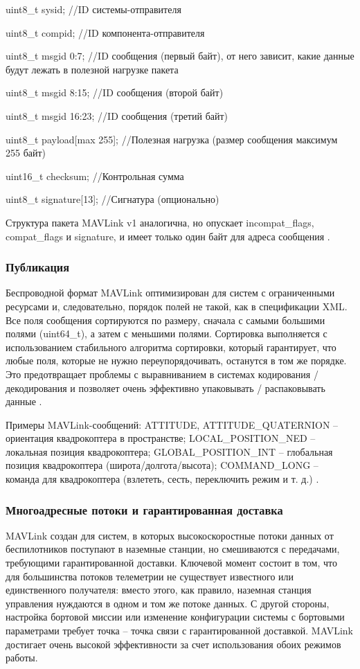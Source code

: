 uint8\_t sysid;              //ID системы-отправителя

uint8\_t compid;             //ID компонента-отправителя

uint8\_t msgid 0:7;          //ID сообщения (первый байт), от него зависит, какие данные будут лежать в полезной нагрузке пакета

uint8\_t msgid 8:15;         //ID сообщения (второй байт)

uint8\_t msgid 16:23;        //ID сообщения (третий байт)

uint8\_t payload[max 255];   //Полезная нагрузка (размер сообщения максимум 255 байт) 

uint16\_t checksum;          //Контрольная сумма

uint8\_t signature[13];      //Сигнатура (опционально)

Структура пакета MAVLink v1 аналогична, но опускает incompat\_flags, compat\_flags и signature, и имеет только один байт для адреса сообщения \cite{mavlink}.

\subsubsection{Публикация}
Беспроводной формат MAVLink оптимизирован для систем с ограниченными ресурсами и, следовательно, порядок полей не такой, как в спецификации XML. Все поля сообщения сортируются по размеру, сначала с самыми большими полями (uint64\_t), а затем с меньшими полями. Сортировка выполняется с использованием стабильного алгоритма сортировки, который гарантирует, что любые поля, которые не нужно переупорядочивать, останутся в том же порядке. Это предотвращает проблемы с выравниванием в системах кодирования / декодирования и позволяет очень эффективно упаковывать / распаковывать данные \cite{mavlink}.

Примеры MAV\-Link-сообщений:
ATTITUDE, ATTITUDE\_QUATERNION – ориентация квадрокоптера в пространстве;
LOCAL\_POSITION\_NED – локальная позиция квадрокоптера;
GLOBAL\_POSITION\_INT – глобальная позиция квадрокоптера (широта/долгота/высота);
COMMAND\_LONG – команда для квадрокоптера (взлететь, сесть, переключить режим и т. д.) \cite{clover}.

\subsubsection{Многоадресные потоки и гарантированная доставка}
MAVLink создан для систем, в которых высокоскоростные потоки данных от беспилотников поступают в наземные станции, но смешиваются с передачами, требующими гарантированной доставки. Ключевой момент состоит в том, что для большинства потоков телеметрии не существует известного или единственного получателя: вместо этого, как правило, наземная станция управления нуждаются в одном и том же потоке данных.
С другой стороны, настройка бортовой миссии или изменение конфигурации системы с бортовыми параметрами требует точка -- точка связи с гарантированной доставкой. MAVLink достигает очень высокой эффективности за счет использования обоих режимов работы.

